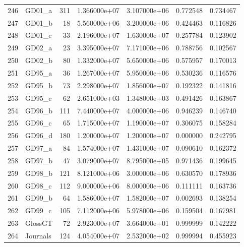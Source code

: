 \begin{tabular}{llrrrrr}
246 &                   GD01\_a &   311 &  1.366000e+07 &  3.107000e+06 &  0.772548 &   0.734467 \\
247 &                   GD01\_b &    18 &  5.560000e+06 &  3.200000e+06 &  0.424463 &   0.116826 \\
248 &                   GD01\_c &    33 &  2.196000e+07 &  1.630000e+07 &  0.257784 &   0.123902 \\
249 &                   GD02\_a &    23 &  3.395000e+07 &  7.171000e+06 &  0.788756 &   0.102567 \\
250 &                   GD02\_b &    80 &  1.332000e+07 &  5.650000e+06 &  0.575957 &   0.170013 \\
251 &                   GD95\_a &    36 &  1.267000e+07 &  5.950000e+06 &  0.530236 &   0.116576 \\
252 &                   GD95\_b &    73 &  2.298000e+07 &  1.856000e+07 &  0.192322 &   0.141816 \\
253 &                   GD95\_c &    62 &  2.651000e+03 &  1.348000e+03 &  0.491426 &   0.163867 \\
254 &                   GD96\_b &   111 &  7.440000e+07 &  4.000000e+06 &  0.946239 &   0.146740 \\
255 &                   GD96\_c &    65 &  1.715000e+07 &  1.190000e+07 &  0.306075 &   0.158284 \\
256 &                   GD96\_d &   180 &  1.200000e+07 &  1.200000e+07 &  0.000000 &   0.242795 \\
257 &                   GD97\_a &    84 &  1.574000e+07 &  1.431000e+07 &  0.090610 &   0.162372 \\
258 &                   GD97\_b &    47 &  3.079000e+07 &  8.795000e+05 &  0.971436 &   0.199645 \\
259 &                   GD98\_b &   121 &  8.121000e+06 &  3.000000e+06 &  0.630570 &   0.178936 \\
260 &                   GD98\_c &   112 &  9.000000e+06 &  8.000000e+06 &  0.111111 &   0.163736 \\
261 &                   GD99\_b &    64 &  1.586000e+07 &  1.582000e+07 &  0.002693 &   0.138254 \\
262 &                   GD99\_c &   105 &  7.112000e+06 &  5.978000e+06 &  0.159504 &   0.167981 \\
263 &                  GlossGT &    72 &  2.923000e+07 &  3.664000e+01 &  0.999999 &   0.142222 \\
264 &                 Journals &   124 &  4.054000e+07 &  2.532000e+02 &  0.999994 &   0.455923 \\

\end{tabular}

